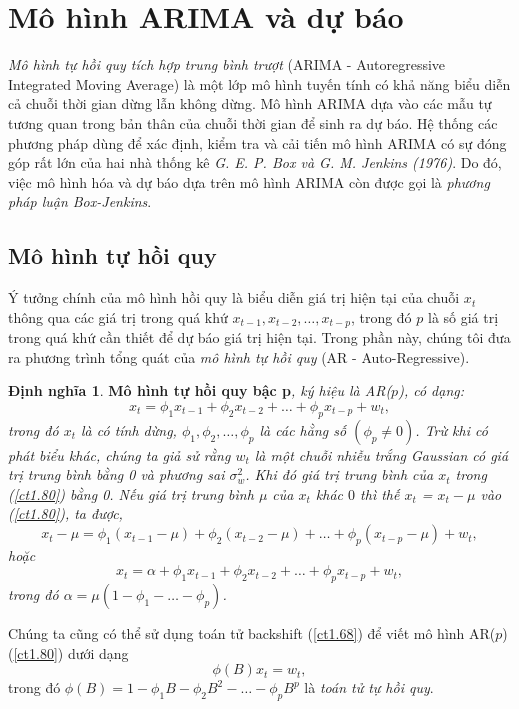 \documentclass[12pt, a4paper,oneside]{book}
\theoremstyle{definition}
\newtheorem{dn}[theo]{Định nghĩa}
\begin{document}
\section{Mô hình ARIMA và dự báo}
\textit{Mô hình tự hồi quy tích hợp trung bình trượt} (ARIMA - Autoregressive Integrated Moving Average) là một lớp mô hình tuyến tính có khả năng biểu diễn cả chuỗi thời gian dừng lẫn không dừng. Mô hình ARIMA dựa vào các mẫu tự tương quan trong bản thân của chuỗi thời gian để sinh ra dự báo. Hệ thống các phương pháp dùng để xác định, kiểm tra và cải tiến mô hình ARIMA có sự đóng góp rất lớn của hai nhà thống kê \textit{G. E. P. Box và G. M. Jenkins (1976)}. Do đó, việc mô hình hóa và dự báo dựa trên mô hình ARIMA còn được gọi là \textit{phương pháp luận Box-Jenkins}. 
\subsection{Mô hình tự hồi quy}

Ý tưởng chính của mô hình hồi quy là biểu diễn giá trị hiện tại của chuỗi $x_{t}$ thông qua các giá trị trong quá khứ $x_{t-1}, x_{t-2}, \dots, x_{t-p}$, trong đó $p$ là số giá trị trong quá khứ cần thiết để dự báo giá trị hiện tại. Trong phần này, chúng tôi đưa ra phương trình tổng quát của \textit{mô hình tự hồi quy} (AR - Auto-Regressive).
\begin{dn}\cite{1, 2, 5}
	\textbf{Mô hình tự hồi quy bậc p}\textit{, ký hiệu là AR($p$), có dạng:
		\begin{equation}
		x_{t} = \phi_{1}x_{t-1} + \phi_{2}x_{t-2} + \dots+ \phi_{p}x_{t-p}+ w_{t}, \label{ct1.80}
		\end{equation}	
		trong đó $x_{t}$ là có tính dừng, $\phi_{1}, \phi_{2}, \dots, \phi_{p}$ là các hằng số $(\phi_{p} \neq 0)$. Trừ khi có phát biểu khác, chúng ta giả sử rằng $w_{t}$ là một chuỗi nhiễu trắng Gaussian có giá trị trung bình bằng 0 và phương sai $\sigma^{2}_w$. Khi đó giá trị trung bình của $x_t$ trong (\ref{ct1.80}) bằng 0. Nếu giá trị trung bình $\mu$ của $x_{t}$ khác $0$ thì thế $x_{t}$ = $x_{t} − \mu$ vào (\ref{ct1.80}), ta được,
		\begin{equation}
		x_{t} − \mu= \phi_{1}(x_{t-1} - \mu) + \phi_{2}(x_{t-2}-\mu) +\dots+\phi_{p}(x_{t-p}- \mu) +w_{t}, \label{ct1.81}
		\end{equation}
		hoặc
		\begin{equation}
		x_{t}= \alpha + \phi_{1}x_{t-1} + \phi_{2}x_{t-2}+\dots+ \phi_{p}x_{t-p}+ w_{t}, \label{ct1.82}
		\end{equation}
		trong đó $\alpha = \mu(1-\phi_{1}-\dots-\phi_{p})$.}
\end{dn}
Chúng ta cũng có thể sử dụng toán tử backshift (\ref{ct1.68}) để viết mô hình AR($p$) (\ref{ct1.80}) dưới dạng
\begin{equation}
\phi(B)x_{t}= w_{t}, \label{ct1.84}	
\end{equation}
trong đó $\phi(B)=1-\phi_{1}B - \phi_{2}B^{2}- \dots- \phi_{p}B^{p}$ là \textit{toán tử tự hồi quy}.
\end{document}
